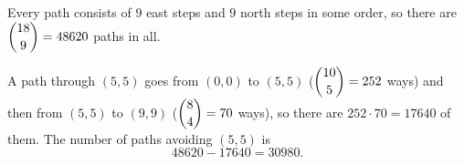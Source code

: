 Every path consists of $9$ east steps and $9$ north steps in some order, so there are $\dbinom{18}{9}=48620$ paths in all.

A path through $(5,5)$ goes from $(0,0)$ to $(5,5)$ ($\dbinom{10}{5}=252$ ways) and then from $(5,5)$ to $(9,9)$ ($\dbinom84=70$ ways), so there are $252\cdot70=17640$ of them. The number of paths avoiding $(5,5)$ is
\[48620-17640=\boxed{30980}.\]
